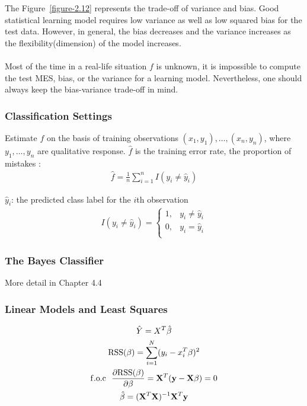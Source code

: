     \documentclass[12pt,fleqn,a4paper]{article}
\theoremstyle{definition}
\theoremstyle{plain}
\begin{document}
The Figure~\ref{figure-2.12} represents the trade-off of variance and bias. Good statistical learning model requires low variance as well as low squared bias for the test data.
However, in general, the bias decreases and the variance increases as the flexibility(dimension) of the model increases. \\
~\\
Most of the time in a real-life situation $f$ is unknown, it is impossible to compute the test MES, bias, or the variance for a learning model.
Nevertheless, one should always keep the bias-variance trade-off in mind.


\subsubsection{\textbf{Classification Settings}}
Estimate $f$ on the basis of training observations ${(x_{1},y_{1}),\dots,(x_{n},y_{n})}$, where $y_{1},\dots,y_{n}$ are qualitative response.
$\hat{f}$ is the training error rate, the proportion of mistakes :
\begin{gather}
\hat{f} = \frac{1}{n}\sum\limits_{i=1}^{n}I(y_{i}\neq \hat{y}_{i})
\end{gather}

$\hat{y}_{i}$: the predicted class label for the $i$th observation
\begin{gather}
I(y_{i}\neq \hat{y}_{i}) = \left\{
\begin{array}{ll}
1, & y_{i}\neq \hat{y}_{i}\\
0, & y_{i}=\hat{y}_{i}\\
\end{array} \right.
\end{gather}


\subsubsection{\textbf{The Bayes Classifier}}

More detail in Chapter 4.4

\subsubsection{\textbf{Linear Models and Least Squares}}
\begin{gather}
\hat{Y} = X^{T}\hat{\beta} \\
{\rm RSS}(\beta) = \sum\limits_{i=1}^{N} (y_{i}-x_{i}^{T}\beta)^{2} \\
{\rm f.o.c}~~ \frac{\partial {\rm RSS}(\beta)}{\partial \beta} = \mathbf{X}^{T}(\mathbf{y}-\mathbf{X}\beta)=0 \\
\hat{\beta} = (\mathbf{X}^{T}\mathbf{X})^{-1}\mathbf{X}^{T}\mathbf{y}
\end{gather}
\end{document}
